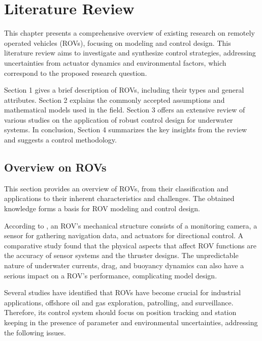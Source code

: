 \chapter{Literature Review}
\label{chap:lr}


This chapter presents a comprehensive overview of existing research on remotely operated vehicles (ROVs), 
focusing on modeling and control design. This literature review aims to investigate and synthesize 
control strategies, addressing uncertainties from actuator dynamics and environmental factors, which 
correspond to the proposed research question.

Section 1 gives a brief description of ROVs, including their types and general attributes. 
Section 2 explains the commonly accepted assumptions and mathematical models used in the field. 
Section 3 offers an extensive review of various studies on the application of robust control 
design for underwater systems. In conclusion, Section 4 summarizes the key insights from the review 
and suggests a control methodology.

\section{Overview on ROVs}

This section provides an overview of ROVs, from their classification and applications to their 
inherent characteristics and challenges. The obtained knowledge forms a basis for ROV modeling 
and control design.

According to \cite{rov_review}, an ROV's mechanical structure consists of a monitoring camera, a sensor 
for gathering navigation data, and actuators for directional control. A 
comparative study \cite{overview} found that the physical aspects that affect ROV functions are the accuracy of 
sensor systems and the thruster designs. The unpredictable nature of underwater currents, drag, 
and buoyancy dynamics can also have a serious impact on a ROV's performance, complicating model 
design.

Several studies \cite{rov_review, overview} have identified that ROVs have become crucial for industrial applications, 
offshore oil and gas exploration, patrolling, and surveillance. Therefore, its control system 
should focus on position tracking and station keeping in the presence of parameter and environmental uncertainties, addressing the following issues.

